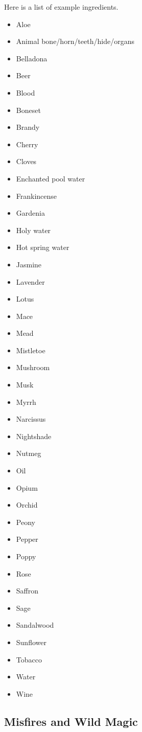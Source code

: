 \documentclass[twoside]{article}
\begin{document}
\bigbreak

Here is a list of example ingredients.

\begin{itemize}[nosep]
\item Aloe
\item Animal bone/horn/teeth/hide/organs
\item Belladona
\item Beer
\item Blood
\item Boneset
\item Brandy
\item Cherry
\item Cloves
\item Enchanted pool water
\item Frankincense
\item Gardenia
\item Holy water
\item Hot spring water
\item Jasmine
\item Lavender
\item Lotus
\item Mace
\item Mead
\item Mistletoe
\item Mushroom
\item Musk
\item Myrrh
\item Narcissus
\item Nightshade
\item Nutmeg
\item Oil
\item Opium
\item Orchid
\item Peony
\item Pepper
\item Poppy
\item Rose
\item Saffron
\item Sage
\item Sandalwood
\item Sunflower
\item Tobacco
\item Water
\item Wine
\end{itemize}

\subsection*{Misfires and Wild Magic}
\end{document}
